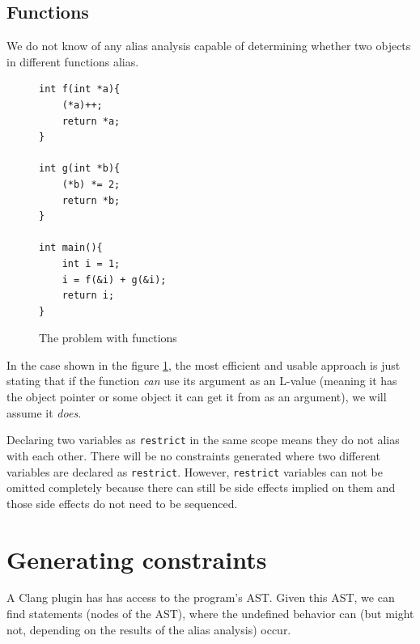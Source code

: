 \subsection{Functions}
We do not know of any alias analysis capable of determining whether two objects in different functions alias.

\begin{figure}
\caption{The problem with functions}
\label{functions-source}
\begin{lstlisting}
int f(int *a){
    (*a)++;
    return *a;
}

int g(int *b){
    (*b) *= 2;
    return *b;
}

int main(){
    int i = 1;
    i = f(&i) + g(&i);
    return i;
}
\end{lstlisting}
\end{figure}

In the case shown in the figure \ref{functions-source}, the most efficient and usable approach is just stating that if the function \emph{can} use its argument as an L-value (meaning it has the object pointer or some object it can get it from as an argument), we will assume it \emph{does}.

Declaring two variables as \verb|restrict| in the same scope means they do not alias with each other.
There will be no constraints generated where two different variables are declared as \verb|restrict|.
However, \verb|restrict| variables can not be omitted completely because there can still be side effects
implied on them and those side effects do not need to be sequenced.

\section{Generating constraints}
A Clang plugin has has access to the program's AST. Given this AST, we can find statements (nodes of the AST), where the undefined behavior can (but might not, depending on the results of the alias analysis) occur.
